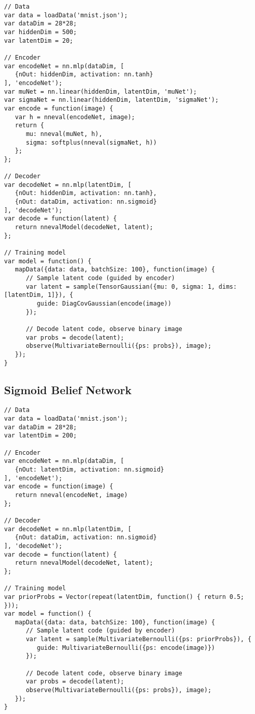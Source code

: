 \begin{lstlisting}
// Data
var data = loadData('mnist.json');
var dataDim = 28*28;
var hiddenDim = 500;
var latentDim = 20;

// Encoder
var encodeNet = nn.mlp(dataDim, [
   {nOut: hiddenDim, activation: nn.tanh}
], 'encodeNet');
var muNet = nn.linear(hiddenDim, latentDim, 'muNet');
var sigmaNet = nn.linear(hiddenDim, latentDim, 'sigmaNet');
var encode = function(image) {
   var h = nneval(encodeNet, image);
   return {
      mu: nneval(muNet, h),
      sigma: softplus(nneval(sigmaNet, h))
   };
};

// Decoder
var decodeNet = nn.mlp(latentDim, [
   {nOut: hiddenDim, activation: nn.tanh},
   {nOut: dataDim, activation: nn.sigmoid}
], 'decodeNet');
var decode = function(latent) {
   return nnevalModel(decodeNet, latent);
};

// Training model
var model = function() {
   mapData({data: data, batchSize: 100}, function(image) {
      // Sample latent code (guided by encoder)
      var latent = sample(TensorGaussian({mu: 0, sigma: 1, dims: [latentDim, 1]}), {
         guide: DiagCovGaussian(encode(image))
      });

      // Decode latent code, observe binary image
      var probs = decode(latent);
      observe(MultivariateBernoulli({ps: probs}), image);
   });
}
\end{lstlisting}

\subsection{Sigmoid Belief Network}
\label{sec:appendix_code:sbn}

\begin{lstlisting}
// Data
var data = loadData('mnist.json');
var dataDim = 28*28;
var latentDim = 200;

// Encoder
var encodeNet = nn.mlp(dataDim, [
   {nOut: latentDim, activation: nn.sigmoid}
], 'encodeNet');
var encode = function(image) {
   return nneval(encodeNet, image)
};

// Decoder
var decodeNet = nn.mlp(latentDim, [
   {nOut: dataDim, activation: nn.sigmoid}
], 'decodeNet');
var decode = function(latent) {
   return nnevalModel(decodeNet, latent);
};

// Training model
var priorProbs = Vector(repeat(latentDim, function() { return 0.5; }));
var model = function() {
   mapData({data: data, batchSize: 100}, function(image) {
      // Sample latent code (guided by encoder)
      var latent = sample(MultivariateBernoulli({ps: priorProbs}), {
         guide: MultivariateBernoulli({ps: encode(image)})
      });

      // Decode latent code, observe binary image
      var probs = decode(latent);
      observe(MultivariateBernoulli({ps: probs}), image);
   });
}
\end{lstlisting}


